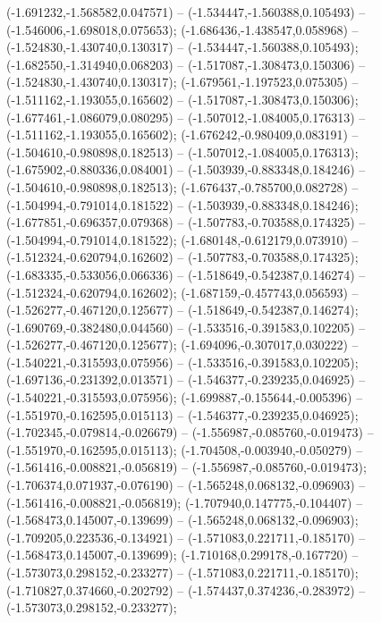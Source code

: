  (-1.691232,-1.568582,0.047571) -- (-1.534447,-1.560388,0.105493) -- (-1.546006,-1.698018,0.075653);
 (-1.686436,-1.438547,0.058968) -- (-1.524830,-1.430740,0.130317) -- (-1.534447,-1.560388,0.105493);
 (-1.682550,-1.314940,0.068203) -- (-1.517087,-1.308473,0.150306) -- (-1.524830,-1.430740,0.130317);
 (-1.679561,-1.197523,0.075305) -- (-1.511162,-1.193055,0.165602) -- (-1.517087,-1.308473,0.150306);
 (-1.677461,-1.086079,0.080295) -- (-1.507012,-1.084005,0.176313) -- (-1.511162,-1.193055,0.165602);
 (-1.676242,-0.980409,0.083191) -- (-1.504610,-0.980898,0.182513) -- (-1.507012,-1.084005,0.176313);
 (-1.675902,-0.880336,0.084001) -- (-1.503939,-0.883348,0.184246) -- (-1.504610,-0.980898,0.182513);
 (-1.676437,-0.785700,0.082728) -- (-1.504994,-0.791014,0.181522) -- (-1.503939,-0.883348,0.184246);
 (-1.677851,-0.696357,0.079368) -- (-1.507783,-0.703588,0.174325) -- (-1.504994,-0.791014,0.181522);
 (-1.680148,-0.612179,0.073910) -- (-1.512324,-0.620794,0.162602) -- (-1.507783,-0.703588,0.174325);
 (-1.683335,-0.533056,0.066336) -- (-1.518649,-0.542387,0.146274) -- (-1.512324,-0.620794,0.162602);
 (-1.687159,-0.457743,0.056593) -- (-1.526277,-0.467120,0.125677) -- (-1.518649,-0.542387,0.146274);
 (-1.690769,-0.382480,0.044560) -- (-1.533516,-0.391583,0.102205) -- (-1.526277,-0.467120,0.125677);
 (-1.694096,-0.307017,0.030222) -- (-1.540221,-0.315593,0.075956) -- (-1.533516,-0.391583,0.102205);
 (-1.697136,-0.231392,0.013571) -- (-1.546377,-0.239235,0.046925) -- (-1.540221,-0.315593,0.075956);
 (-1.699887,-0.155644,-0.005396) -- (-1.551970,-0.162595,0.015113) -- (-1.546377,-0.239235,0.046925);
 (-1.702345,-0.079814,-0.026679) -- (-1.556987,-0.085760,-0.019473) -- (-1.551970,-0.162595,0.015113);
 (-1.704508,-0.003940,-0.050279) -- (-1.561416,-0.008821,-0.056819) -- (-1.556987,-0.085760,-0.019473);
 (-1.706374,0.071937,-0.076190) -- (-1.565248,0.068132,-0.096903) -- (-1.561416,-0.008821,-0.056819);
 (-1.707940,0.147775,-0.104407) -- (-1.568473,0.145007,-0.139699) -- (-1.565248,0.068132,-0.096903);
 (-1.709205,0.223536,-0.134921) -- (-1.571083,0.221711,-0.185170) -- (-1.568473,0.145007,-0.139699);
 (-1.710168,0.299178,-0.167720) -- (-1.573073,0.298152,-0.233277) -- (-1.571083,0.221711,-0.185170);
 (-1.710827,0.374660,-0.202792) -- (-1.574437,0.374236,-0.283972) -- (-1.573073,0.298152,-0.233277);
